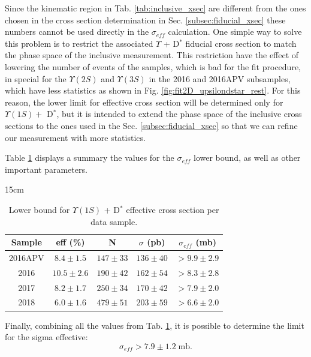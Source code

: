 Since the kinematic region in Tab. \ref{tab:inclusive_xsec} are different from the ones chosen in the cross section determination in Sec. \ref{subsec:fiducial_xsec} these numbers cannot be used directly in the $\sigma_{eff}$ calculation. One simple way to solve this problem is to restrict the associated $\Upsilon$ + D$^*$ fiducial cross section to match the phase space of the inclusive measurement. This restriction have the effect of lowering the number of events of the samples, which is bad for the fit procedure, in special for the $\Upsilon(2S)$ and $\Upsilon(3S)$ in the 2016 and 2016APV subsamples, which have less statistics as shown in Fig. \ref{fig:fit2D_upsilondstar_rest}. For this reason, the lower limit for effective cross section will be determined only for $\Upsilon(1S) +$ D$^*$, but it is intended to extend the phase space of the inclusive cross sections to the ones used in the Sec. \ref{subsec:fiducial_xsec} so that we can refine our measurement with more statistics.

Table \ref{tab:xsec_eff} displays a summary the values for the $\sigma_{eff}$ lower bound, as well as other important parameters.

\begin{table}[!htbp]{15cm}
  \caption{Lower bound for $\Upsilon(1S)$ + D$^{*}$ effective cross section per data sample.}
  \begin{tabular}{ c | c | c | c | c }
    \hline
    Sample  & eff (\%)             & N            & $\sigma$ (pb)     & $\sigma_{eff}$ (mb)  \\ \hline
    2016APV & $8.4 \pm 1.5$  & $147 \pm 33$ & $136 \pm 40$ & $>9.9 \pm 2.9$ \\ \hline
    2016    & $10.5 \pm 2.6$ & $190 \pm 42$ & $162 \pm 54$ & $>8.3 \pm 2.8$ \\ \hline
    2017    & $8.2 \pm 1.7$  & $250 \pm 34$ & $170 \pm 42$ & $>7.9 \pm 2.0$ \\ \hline
    2018    & $6.0 \pm 1.6$  & $479 \pm 51$ & $203 \pm 59$ & $>6.6 \pm 2.0$ \\ \hline
  \end{tabular}
  \label{tab:xsec_eff}
\end{table}

Finally, combining all the values from Tab. \ref{tab:xsec_eff}, it is possible to determine the limit for the sigma effective:
\begin{equation}
  \sigma_{eff} > 7.9 \pm 1.2 \; \text{mb}.
\end{equation}

